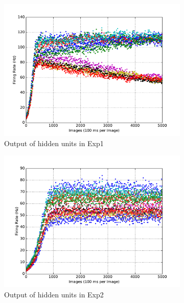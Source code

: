 \begin{figure}
\begin{subfigure}[t]{0.4\textwidth}
		\includegraphics[width=\textwidth]{pics_sdlm/17_exp_SRBM_all_long/exp1_hid_s.pdf}
		\caption{Output of hidden units in Exp1}
	\end{subfigure}
	\begin{subfigure}[t]{0.4\textwidth}
		\includegraphics[width=\textwidth]{pics_sdlm/17_exp_SRBM_all_long/exp2_hid_s.pdf}
		\caption{Output of hidden units in Exp2}
	\end{subfigure}\\
	\begin{subfigure}[t]{0.4\textwidth}

\end{subfigure}
\end{figure}
